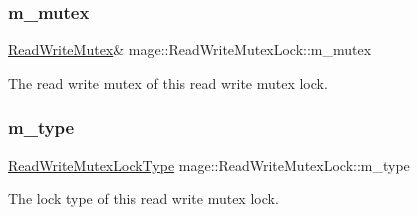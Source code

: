 \subsubsection{\texorpdfstring{m\+\_\+mutex}{m\_mutex}}
{\footnotesize\ttfamily \hyperlink{classmage_1_1_read_write_mutex}{Read\+Write\+Mutex}\& mage\+::\+Read\+Write\+Mutex\+Lock\+::m\+\_\+mutex\hspace{0.3cm}{\ttfamily [private]}}

The read write mutex of this read write mutex lock. \hypertarget{structmage_1_1_read_write_mutex_lock_aa117ffe94f6850ddc91ad6d1389fb6e2}{}\label{structmage_1_1_read_write_mutex_lock_aa117ffe94f6850ddc91ad6d1389fb6e2} 
\subsubsection{\texorpdfstring{m\+\_\+type}{m\_type}}
{\footnotesize\ttfamily \hyperlink{namespacemage_afd76fcca37ce5c5b2227671290973c74}{Read\+Write\+Mutex\+Lock\+Type} mage\+::\+Read\+Write\+Mutex\+Lock\+::m\+\_\+type\hspace{0.3cm}{\ttfamily [private]}}

The lock type of this read write mutex lock. 